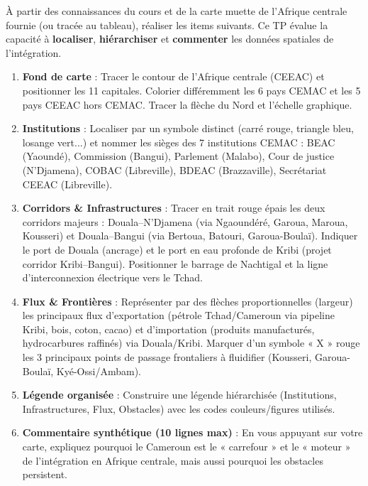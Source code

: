 \documentclass[11pt]{article}
\newcounter{popsec}
\newcounter{popsub}
\newcommand{\courssub}[1]{%
  \stepcounter{popsub}%
  \par\vspace{9pt}\noindent{\popxbold\fontsize{11.5}{13}\selectfont\color{popink}{\color{poporange}\thepopsec.\thepopsub}\hspace{6pt}#1}\par\nopagebreak\vspace{4pt}
}
\begin{document}
\courssub{Consignes}

À partir des connaissances du cours et de la carte muette de l'Afrique centrale fournie (ou tracée au tableau), réaliser les items suivants. Ce TP évalue la capacité à \textbf{localiser}, \textbf{hiérarchiser} et \textbf{commenter} les données spatiales de l'intégration.

\begin{exercice}
\begin{enumerate}
\item \textbf{Fond de carte} : Tracer le contour de l'Afrique centrale (CEEAC) et positionner les 11 capitales. Colorier différemment les 6 pays CEMAC et les 5 pays CEEAC hors CEMAC. Tracer la flèche du Nord et l'échelle graphique.
\item \textbf{Institutions} : Localiser par un symbole distinct (carré rouge, triangle bleu, losange vert...) et nommer les sièges des 7 institutions CEMAC : BEAC (Yaoundé), Commission (Bangui), Parlement (Malabo), Cour de justice (N'Djamena), COBAC (Libreville), BDEAC (Brazzaville), Secrétariat CEEAC (Libreville).
\item \textbf{Corridors \& Infrastructures} : Tracer en trait rouge épais les deux corridors majeurs : Douala--N'Djamena (via Ngaoundéré, Garoua, Maroua, Kousseri) et Douala--Bangui (via Bertoua, Batouri, Garoua-Boulaï). Indiquer le port de Douala (ancrage) et le port en eau profonde de Kribi (projet corridor Kribi--Bangui). Positionner le barrage de Nachtigal et la ligne d'interconnexion électrique vers le Tchad.
\item \textbf{Flux \& Frontières} : Représenter par des flèches proportionnelles (largeur) les principaux flux d'exportation (pétrole Tchad/Cameroun via pipeline Kribi, bois, coton, cacao) et d'importation (produits manufacturés, hydrocarbures raffinés) via Douala/Kribi. Marquer d'un symbole « X » rouge les 3 principaux points de passage frontaliers à fluidifier (Kousseri, Garoua-Boulaï, Kyé-Ossi/Ambam).
\item \textbf{Légende organisée} : Construire une légende hiérarchisée (Institutions, Infrastructures, Flux, Obstacles) avec les codes couleurs/figures utilisés.
\item \textbf{Commentaire synthétique (10 lignes max)} : En vous appuyant sur votre carte, expliquez pourquoi le Cameroun est le « carrefour » et le « moteur » de l'intégration en Afrique centrale, mais aussi pourquoi les obstacles persistent.
\end{enumerate}
\end{exercice}
\end{document}
